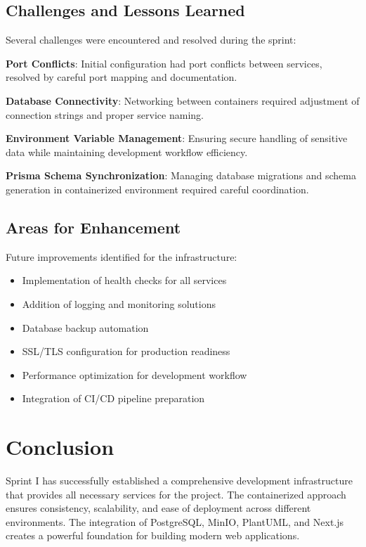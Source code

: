 \subsection{Challenges and Lessons Learned}

Several challenges were encountered and resolved during the sprint:

\textbf{Port Conflicts}: Initial configuration had port conflicts between services, resolved by careful port mapping and documentation.

\textbf{Database Connectivity}: Networking between containers required adjustment of connection strings and proper service naming.

\textbf{Environment Variable Management}: Ensuring secure handling of sensitive data while maintaining development workflow efficiency.

\textbf{Prisma Schema Synchronization}: Managing database migrations and schema generation in containerized environment required careful coordination.

\subsection{Areas for Enhancement}

Future improvements identified for the infrastructure:

\begin{itemize}
    \item Implementation of health checks for all services
    \item Addition of logging and monitoring solutions
    \item Database backup automation
    \item SSL/TLS configuration for production readiness
    \item Performance optimization for development workflow
    \item Integration of CI/CD pipeline preparation
\end{itemize}

\section{Conclusion}

Sprint I has successfully established a comprehensive development infrastructure that provides all necessary services for the project. The containerized approach ensures consistency, scalability, and ease of deployment across different environments. The integration of PostgreSQL, MinIO, PlantUML, and Next.js creates a powerful foundation for building modern web applications.

